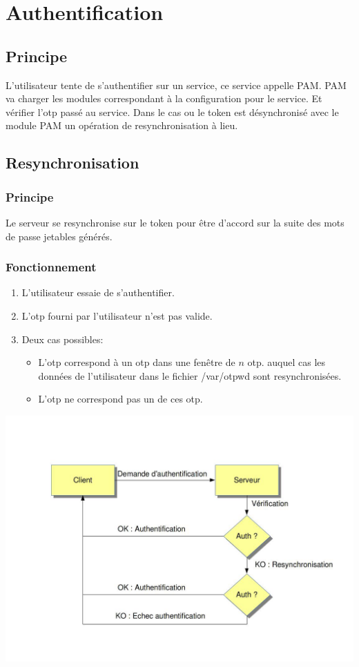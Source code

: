 \documentclass{"../../res/univ-projet"}
\begin{document}
\section{Authentification}
\subsection{Principe}
L'utilisateur tente de s'authentifier sur un service, ce service appelle PAM. 
PAM va charger les modules correspondant à la configuration pour le service.
Et vérifier l'otp passé au service. Dans le cas ou le token est désynchronisé
avec le module PAM un opération de resynchronisation à lieu.

\subsection{Resynchronisation}
\subsubsection{Principe}
Le serveur se resynchronise sur le token pour être d'accord sur la suite des
mots de passe jetables générés.

\subsubsection{Fonctionnement}
\begin{enumerate}
    \item L'utilisateur essaie de s'authentifier.
    \item L'otp fourni par l'utilisateur n'est pas valide.
    \item Deux cas possibles:
    \begin{itemize}
    	\item L'otp correspond à un otp dans une fenêtre de $n$ otp.
    		auquel cas les données de l'utilisateur dans le fichier
    		/var/otpwd sont resynchronisées.
    	\item L'otp ne correspond pas un de ces otp.
    \end{itemize}
\end{enumerate}
\includegraphics[width=\textwidth]{../graphics/resynchronisation.jpg}
\end{document}
